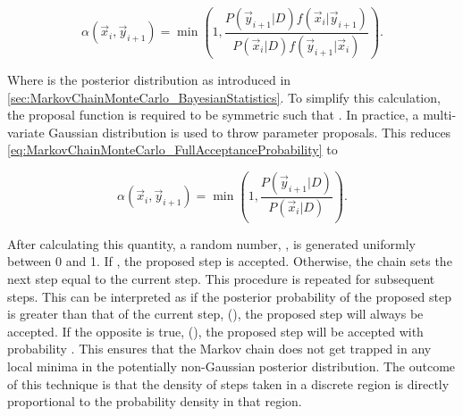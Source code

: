 \begin{equation}
  \label{eq:MarkovChainMonteCarlo_FullAcceptanceProbability}
  \alpha(\vec{x}_{i},\vec{y}_{i+1}) = \min\left(1,\frac{P(\vec{y}_{i+1}|D)f(\vec{x}_{i}|\vec{y}_{i+1})}{P(\vec{x}_{i}|D)f(\vec{y}_{i+1}|\vec{x}_{i})} \right).
\end{equation}

Where  is the posterior distribution as introduced in \autoref{sec:MarkovChainMonteCarlo_BayesianStatistics}. To simplify this calculation, the proposal function is required to be symmetric such that . In practice, a multi-variate Gaussian distribution is used to throw parameter proposals. This reduces \autoref{eq:MarkovChainMonteCarlo_FullAcceptanceProbability} to

\begin{equation}
  \label{eq:MarkovChainMonteCarlo_ReducedAcceptanceProbability}
  \alpha(\vec{x}_{i},\vec{y}_{i+1}) = \min\left(1,\frac{P(\vec{y}_{i+1}|D)}{P(\vec{x}_{i}|D)} \right).
\end{equation}


After calculating this quantity, a random number, \quickmath{\beta}, is generated uniformly between 0 and 1. If , the proposed step is accepted. Otherwise, the chain sets the next step equal to the current step. This procedure is repeated for subsequent steps. This can be interpreted as if the posterior probability of the proposed step is greater than that of the current step, (), the proposed step will always be accepted. If the opposite is true, (), the proposed step will be accepted with probability . This ensures that the Markov chain does not get trapped in any local minima in the potentially non-Gaussian posterior distribution. The outcome of this technique is that the density of steps taken in a discrete region is directly proportional to the probability density in that region.

